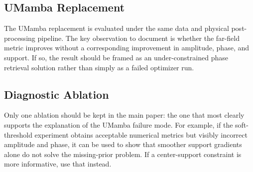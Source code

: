 
\subsection{UMamba Replacement}
The UMamba replacement is evaluated under the same data and physical
post-processing pipeline. The key observation to document is whether the
far-field metric improves without a corresponding improvement in amplitude,
phase, and support. If so, the result should be framed as an under-constrained
phase retrieval solution rather than simply as a failed optimizer run.


\subsection{Diagnostic Ablation}
Only one ablation should be kept in the main paper: the one that most clearly
supports the explanation of the UMamba failure mode. For example, if the
soft-threshold experiment obtains acceptable numerical metrics but visibly
incorrect amplitude and phase, it can be used to show that smoother support
gradients alone do not solve the missing-prior problem. If a center-support
constraint is more informative, use that instead.

